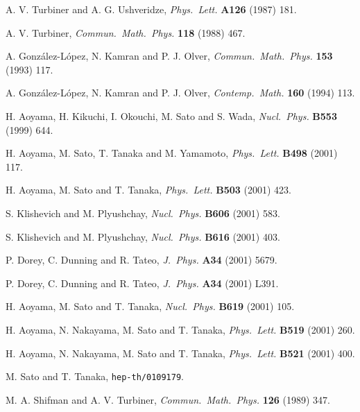 \documentclass[a4paper,preprint,amsfonts,amssymb,amsmath,%
tightenlines,nofootinbib,noshowpacs]{revtex4}
\begin{document}
\begin{thebibliography}{99}
\newcommand{\J}[4]{\textit{#1} \textbf{#2} (#3) #4}


A. V. Turbiner and A. G. Ushveridze,
\J{Phys.~Lett.}{A126}{1987}{181}.

A. V. Turbiner,
\J{Commun.~Math.~Phys.}{118}{1988}{467}.

A. Gonz{\'{a}}lez-L{\'{o}}pez, N. Kamran and P. J. Olver,
\J{Commun.~Math.~Phys.}{153}{1993}{117}.

A. Gonz{\'{a}}lez-L{\'{o}}pez, N. Kamran and P. J. Olver,
\J{Contemp.~Math.}{160}{1994}{113}.

H. Aoyama, H. Kikuchi, I. Okouchi, M. Sato and S. Wada,
\J{Nucl.~Phys.}{B553}{1999}{644}.

H. Aoyama, M. Sato, T. Tanaka and M. Yamamoto,
\J{Phys.~Lett.}{B498}{2001}{117}.

H. Aoyama, M. Sato and T. Tanaka,
\J{Phys.~Lett.}{B503}{2001}{423}.

S. Klishevich and M. Plyushchay,
\J{Nucl.~Phys.}{B606}{2001}{583}.

S. Klishevich and M. Plyushchay,
\J{Nucl.~Phys.}{B616}{2001}{403}.

P. Dorey, C. Dunning and R. Tateo,
\J{J.~Phys.}{A34}{2001}{5679}.

P. Dorey, C. Dunning and R. Tateo,
\J{J.~Phys.}{A34}{2001}{L391}.

H. Aoyama, M. Sato and T. Tanaka,
\J{Nucl.~Phys.}{B619}{2001}{105}.

H. Aoyama, N. Nakayama, M. Sato and T. Tanaka,
\J{Phys.~Lett.}{B519}{2001}{260}.

H. Aoyama, N. Nakayama, M. Sato and T. Tanaka,
\J{Phys.~Lett.}{B521}{2001}{400}.

M. Sato and T. Tanaka, \texttt{hep-th/0109179}.

M. A. Shifman and A. V. Turbiner,
\J{Commun.~Math.~Phys.}{126}{1989}{347}.


\end{thebibliography}
\end{document}
